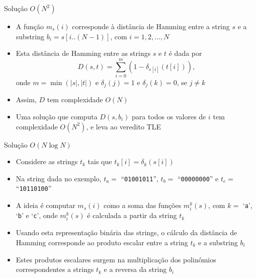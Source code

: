 \begin{frame}[fragile]{Solução $O(N^2)$}

    \begin{itemize}
        \item A função $m_s(i)$ corresponde à distância de Hamming entre a string $s$ e a 
            substring $b_i = s[i..(N - 1)]$, com $i = 1, 2, \ldots, N$

        \item Esta distância de Hamming entre as strings $s$ e $t$ é dada por
        \[
            D(s, t) = \sum_{i = 0}^m (1 - \delta_{s[i]}(t[i])),
        \]
        onde $m = \min(|s|, |t|)$ e $\delta_j(j) = 1$ e $\delta_j(k) = 0$, se $j\neq k$

        \item Assim, $D$ tem complexidade $O(N)$

        \item Uma solução que computa $D(s, b_i)$ para todos os valores de $i$ tem complexidade
            $O(N^2)$, e leva ao veredito TLE
    \end{itemize}

\end{frame}

\begin{frame}[fragile]{Solução $O(N\log N)$}

    \begin{itemize}
        \item Considere as strings $t_k$ tais que $t_k[i] = \delta_k(s[i])$

        \item Na string dada no exemplo, $t_a =$ ``\texttt{01001011}'', $t_b =$
            ``\texttt{00000000}'' e $t_c =$ ``\texttt{10110100}''

        \item A ideia é computar $m_s(i)$ como a soma das funções $m^k_i(s)$, com $k =$ 
            `\texttt{a}', `\texttt{b}' e `\texttt{c}', onde $m^k_i(s)$ é calculada a partir da
            string $t_k$

        \item Usando esta representação binária das strings, o cálculo da distância de Hamming 
            corresponde ao produto escalar entre a string $t_k$ e a substring $b_i$

        \item Estes produtos escalares surgem na multiplicação dos polinômios correspondentes a
            strings $t_k$ e a reversa da string $b_i$

    \end{itemize}

\end{frame}

